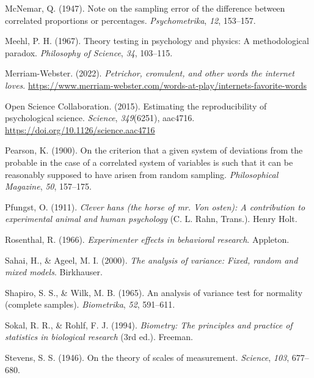 \documentclass[
]{book}
\newlength{\cslhangindent}
\newlength{\cslentryspacingunit} %
\newenvironment{CSLReferences}[2] %
 {%
  \setlength{\parindent}{0pt}
  \ifodd #1
  \let\oldpar\par
  \def\par{\hangindent=\cslhangindent\oldpar}
  \fi
  \setlength{\parskip}{#2\cslentryspacingunit}
 }%
 {}
\theoremstyle{definition}
\theoremstyle{definition}
\theoremstyle{definition}
\theoremstyle{definition}
\theoremstyle{remark}
\begin{document}
\begin{CSLReferences}{1}{0}
\leavevmode{}%
McNemar, Q. (1947). Note on the sampling error of the difference between correlated proportions or percentages. \emph{Psychometrika}, \emph{12}, 153--157.

\leavevmode{}%
Meehl, P. H. (1967). Theory testing in psychology and physics: A methodological paradox. \emph{Philosophy of Science}, \emph{34}, 103--115.

\leavevmode{}%
Merriam-Webster. (2022). \emph{Petrichor, cromulent, and other words the internet loves}. \url{https://www.merriam-webster.com/words-at-play/internets-favorite-words}

\leavevmode{}%
Open Science Collaboration. (2015). Estimating the reproducibility of psychological science. \emph{Science}, \emph{349}(6251), aac4716. \url{https://doi.org/10.1126/science.aac4716}

\leavevmode{}%
Pearson, K. (1900). On the criterion that a given system of deviations from the probable in the case of a correlated system of variables is such that it can be reasonably supposed to have arisen from random sampling. \emph{Philosophical Magazine}, \emph{50}, 157--175.

\leavevmode{}%
Pfungst, O. (1911). \emph{Clever hans (the horse of mr. Von osten): A contribution to experimental animal and human psychology} (C. L. Rahn, Trans.). Henry Holt.

\leavevmode{}%
Rosenthal, R. (1966). \emph{Experimenter effects in behavioral research}. Appleton.

\leavevmode{}%
Sahai, H., \& Ageel, M. I. (2000). \emph{The analysis of variance: Fixed, random and mixed models}. Birkhauser.

\leavevmode{}%
Shapiro, S. S., \& Wilk, M. B. (1965). An analysis of variance test for normality (complete samples). \emph{Biometrika}, \emph{52}, 591--611.

\leavevmode{}%
Sokal, R. R., \& Rohlf, F. J. (1994). \emph{Biometry: The principles and practice of statistics in biological research} (3rd ed.). Freeman.

\leavevmode{}%
Stevens, S. S. (1946). On the theory of scales of measurement. \emph{Science}, \emph{103}, 677--680.


\end{CSLReferences}
\end{document}
